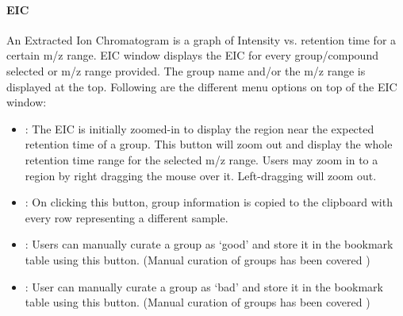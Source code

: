 \documentclass[letterpaper,10pt,english,openany,oneside]{sphinxmanual}
\begin{document}


\paragraph{EIC}
\label{\detokenize{IntroductiontoElMAVENUI:eic}}

An Extracted Ion Chromatogram is a graph of Intensity vs. retention time for a certain m/z range. EIC window displays the EIC for every group/compound selected or m/z range provided. The group name and/or the m/z range is displayed at the top. Following are the different menu options on top of the EIC window:
\begin{itemize}
\item {} 
 : The EIC is initially zoomed-in to display the region near the expected retention time of a group. This button will zoom out and display the whole retention time range for the selected m/z range. Users may zoom in to a region by right dragging the mouse over it. Left-dragging will zoom out.

\item {} 
 : On clicking this button, group information is copied to the clipboard with every row representing a different sample.

\item {} 
 : Users can manually curate a group as ‘good’ and store it in the bookmark table using this button. (Manual curation of groups has been covered )

\end{itemize}

\begin{itemize}
\item {} 
 : User can manually curate a group as ‘bad’ and store it in the bookmark table using this button. (Manual curation of groups has been covered )

\end{itemize}
\end{document}
